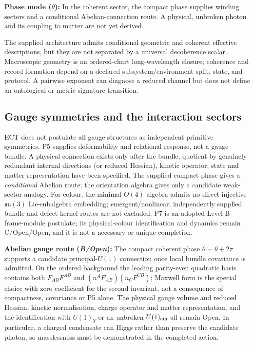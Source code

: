 \documentclass[11pt,a4paper]{article}
\begin{document}
\textbf{Phase mode ($\theta$):} In the coherent sector, the compact phase supplies winding sectors and a conditional Abelian-connection route.  A physical, unbroken photon and its coupling to matter are not yet derived.

The supplied architecture admits conditional geometric and coherent effective
descriptions, but they are not separated by a universal decoherence scalar.
Macroscopic geometry is an ordered-chart long-wavelength closure; coherence
and record formation depend on a declared subsystem/environment split, state,
and protocol.  A pairwise exponent can diagnose a reduced channel but does
not define an ontological or metric-signature transition.

\subsection{Gauge symmetries and the interaction sectors}
\label{sec:pop_gauge}

ECT does not postulate all gauge structures as independent primitive symmetries.  P5 supplies deformability and relational response, not a gauge bundle.  A physical connection exists only after the bundle, quotient by genuinely redundant internal directions (or reduced Hessian), kinetic operator, state and matter representation have been specified.  The supplied compact phase gives a \emph{conditional} Abelian route; the orientation algebra gives only a candidate weak-sector analogy.  For colour, the minimal $O(4)$ algebra admits no direct injective $\mathfrak{su}(3)$ Lie-subalgebra embedding; emergent/nonlinear, independently supplied bundle and defect-kernel routes are not excluded.  P7 is an adopted Level-B frame-module postulate; its physical-colour identification and dynamics remain C/Open/Open, and it is not a necessary or unique completion.

\textbf{Abelian gauge route (\emph{B/Open}):} The compact coherent phase $\theta\sim\theta+2\pi$ supports a candidate principal-$U(1)$ connection once local bundle covariance is admitted.  On the ordered background the leading parity-even quadratic basis contains both $F_{AB}F^{AB}$ and $(n^AF_{AB})(n_CF^{CB})$; Maxwell form is the special choice with zero coefficient for the second invariant, not a consequence of compactness, covariance or P5 alone.  The physical gauge volume and reduced Hessian, kinetic normalisation, charge operator and matter representation, and the identification with $U(1)_Y$ or an unbroken $U(1)_{\rm em}$ all remain Open.  In particular, a charged condensate can Higgs rather than preserve the candidate photon, so masslessness must be demonstrated in the completed action.
\end{document}
